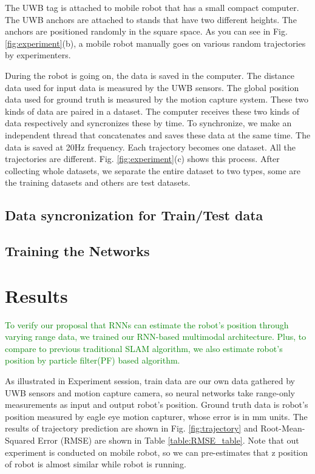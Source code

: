 \documentclass{ieeeaccess}
\begin{document}
The UWB tag is attached to mobile robot that has a small compact computer. The UWB anchors are attached to stands that have two different heights. The anchors are positioned randomly in the square space. As you can see in Fig. \ref{fig:experiment}(b), a mobile robot manually goes on various random trajectories by experimenters.

During the robot is going on, the data is saved in the computer. The distance data used for input data is measured by the UWB sensors. The global position data used for ground truth is measured by the motion capture system. These two kinds of data are paired in a dataset. The computer receives these two kinds of data respectively and syncronizes these by time. To synchronize, we make an independent thread that concatenates and saves these data at the same time. The data is saved at 20Hz frequency. Each trajectory becomes one dataset. All the trajectories are different. Fig. \ref{fig:experiment}(c) shows this process. After collecting whole datasets, we separate the entire dataset to two types, some are the training datasets and others are test datasets.

\subsection{Data syncronization for Train/Test data}
\subsection{Training the Networks}


\section{Results}

\textcolor{green}{To verify our proposal that RNNs can estimate the robot's position through varying range data, we trained our RNN-based multimodal architecture. Plus, to compare to previous traditional SLAM algorithm, we also estimate robot's position by particle filter(PF) based algorithm.}

As illustrated in Experiment session, train data are our own data gathered by UWB sensors and motion capture camera, so neural networks take range-only measurements as input and output robot's position. Ground truth data is robot's position measured by eagle eye motion capturer, whose error is in mm units. The results of trajectory prediction are shown in Fig. \ref{fig:trajectory} and Root-Mean-Squared Error (RMSE) are shown in Table \ref{table:RMSE_table}. Note that out experiment is conducted on mobile robot, so we can pre-estimates that z position of robot is almost similar while robot is running. 
\end{document}
